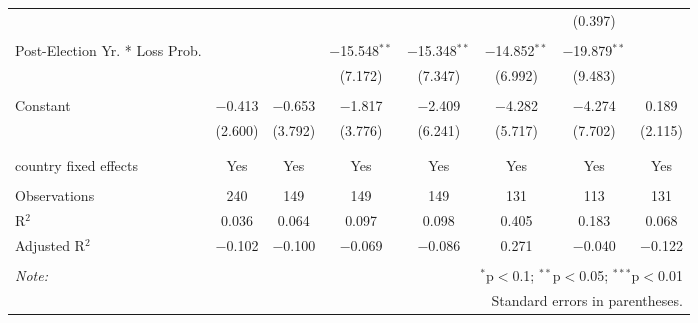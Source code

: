 \begin{tabular}{@{\extracolsep{5pt}}lccccccc}
  &  &  &  &  &  & (0.397) &  \\ 
  & & & & & & & \\ 
 Post-Election Yr. * Loss Prob. &  &  & $-$15.548$^{**}$ & $-$15.348$^{**}$ & $-$14.852$^{**}$ & $-$19.879$^{**}$ &  \\ 
  &  &  & (7.172) & (7.347) & (6.992) & (9.483) &  \\ 
  & & & & & & & \\ 
 Constant & $-$0.413 & $-$0.653 & $-$1.817 & $-$2.409 & $-$4.282 & $-$4.274 & 0.189 \\ 
  & (2.600) & (3.792) & (3.776) & (6.241) & (5.717) & (7.702) & (2.115) \\ 
  & & & & & & & \\ 
\hline \\[-1.8ex] 
country fixed effects & Yes & Yes & Yes & Yes & Yes & Yes & Yes \\ 
\hline \\[-1.8ex] 
Observations & 240 & 149 & 149 & 149 & 131 & 113 & 131 \\ 
R$^{2}$ & 0.036 & 0.064 & 0.097 & 0.098 & 0.405 & 0.183 & 0.068 \\ 
Adjusted R$^{2}$ & $-$0.102 & $-$0.100 & $-$0.069 & $-$0.086 & 0.271 & $-$0.040 & $-$0.122 \\ 
\hline 
\hline \\[-1.8ex] 
\textit{Note:}  & \multicolumn{7}{r}{$^{*}$p$<$0.1; $^{**}$p$<$0.05; $^{***}$p$<$0.01} \\ 
 & \multicolumn{7}{r}{Standard errors in parentheses.} \\ 
\end{tabular} 
\endgroup 

